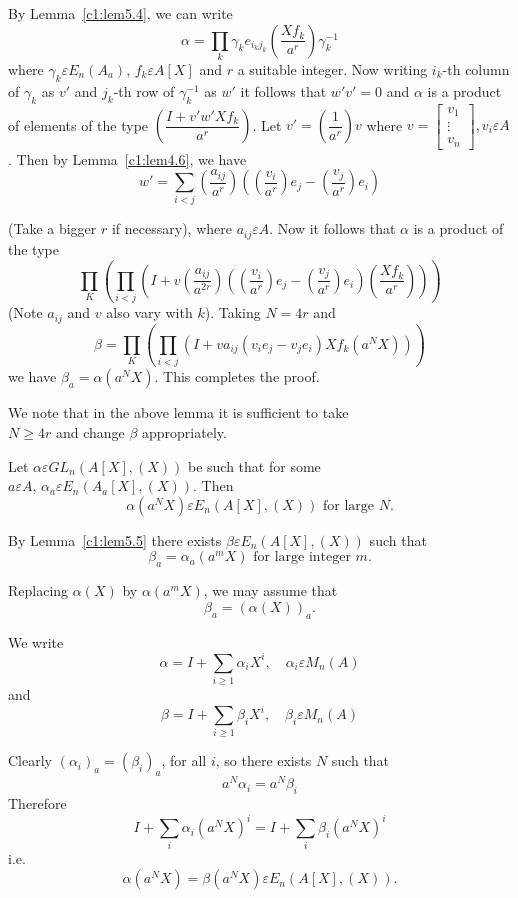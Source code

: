 \begin{Proof}
By Lemma~\ref{c1:lem5.4}, we can write
$$
\alpha=\prod\limits_{k}\gamma_ke_{i_{k}j_{k}}\left(\frac{Xf_k}{a^{r}}\right)\gamma_k^{-1}
$$
where $\gamma_k\varepsilon E_n(A_a)$, $f_k\varepsilon A[X]$ and $r$ a
suitable integer. Now writing $i_k$-th column of $\gamma_k$ as $v'$ and
$j_k$-th row of $\gamma_k^{-1}$ as $w'$ it follows that $w'v'=0$ and
$\alpha$ is a product of elements of the type
$\left(\dfrac{I+v'w'Xf_k}{a^{r}}\right)$. Let
$v'=\left(\dfrac{1}{a^{r}}\right)v$ where $v=\begin{bmatrix}
v_1\\
\vdots\\
v_n
\end{bmatrix}, v_i\varepsilon A$. Then by Lemma~\ref{c1:lem4.6}, we have 
$$
w'=\sum\limits_{i<j}\left(\frac{a_{ij}}{a^{r}}\right)\left(\left(\frac{v_i}{a^{r}}\right)e_j-\left(\frac{v_j}{a^{r}}\right)e_i\right)
$$

(Take a bigger $r$ if necessary), where $a_{ij}\varepsilon A$. Now it
follows that $\alpha$ is a product of the type
$$
\prod\limits_{K}\left(\prod\limits_{i<j}\left(I+v\left(\frac{a_{ij}}{a^{2r}}\right)\left(\left(\frac{v_i}{a^{r}}\right)e_j-\left(\frac{v_j}{a^{r}}\right)e_i\right)\left(\frac{Xf_k}{a^{r}}\right)\right)\right)
$$
(Note $a_{ij}$ and $v$ also vary with $k$). Taking $N=4r$ and 
$$
\beta=\prod\limits_{K}\left(\prod_{i<j}\left(I+va_{ij}\left(v_ie_j-v_je_i\right)Xf_k\left(a^{N}X\right)\right)\right)
$$
we have $\beta_a=\alpha\left(a^{N}X \right)$. This completes the proof.
\enprf
\end{Proof}

We note that in the above lemma it is sufficient to take\\ $N\geq 4r$
and change $\beta$ appropriately.

\begin{coro}\label{c1:coro5.6}
Let $\alpha \varepsilon GL_n(A[X],(X))$ be such that for some\\
$a\varepsilon A$, $\alpha_a \varepsilon E_n (A_a[X],(X))$. Then 
$$
\alpha\left(a^{N}X\right)\varepsilon E_n(A[X],(X)) \text{ for large } N.
$$
\end{coro}

\begin{Proof}
By Lemma~\ref{c1:lem5.5} there exists $\beta \varepsilon E_n(A[X],(X))$
such that 
$$
\beta_a=\alpha_a\left(a^{m}X\right) \text{ for large integer } m.
$$

Replacing $\alpha(X)$ by $\alpha\left(a^{m}X\right)$, we may assume
that 
$$
\beta_a=(\alpha(X))_a.
$$

We write
$$
\alpha=I+\sum\limits_{i\geq 1}\alpha_iX^{i},\quad \alpha_i\varepsilon M_n(A)
$$
and 
$$
\beta=I+\sum\limits_{i\geq 1} \beta_iX^{i},\quad \beta_i\varepsilon M_n(A)
$$

Clearly $(\alpha_i)_a=(\beta_i)_a$, for all $i$, so there exists $N$
such that 
$$
a^{N}\alpha_i=a^{N}\beta_i
$$
Therefore
$$
I+\sum\limits_{i}\alpha_i\left(a^{N}X\right)^{i}=I+\sum\limits_{i}\beta_i\left(a^{N}X\right)^{i}
$$
i.e.
$$
\alpha\left(a^{N}X\right)=\beta\left(a^{N}X\right)\varepsilon E_n(A[X],(X)).
$$
\enprf
\end{Proof}


